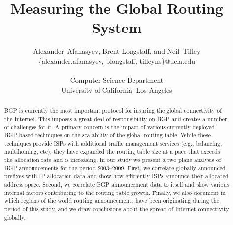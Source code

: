 \documentclass[journal,final]{IEEEtran}%
\title{Measuring the Global Routing System}
\author{
Alexander~Afanasyev, %
Brent Longstaff, and Neil~Tilley \\
\small \{alexander.afanasyev, blongstaff, tilleyns\}@ucla.edu \\ \ \\
\small Computer Science Department \\
\small University of California, Los Angeles 
}
\begin{document}
\maketitle

\begin{abstract} %

BGP is currently the most important protocol for insuring the global
connectivity of the Internet. This imposes a great deal of responsibility on
BGP and creates a number of challenges for it. A primary concern is the impact
of various currently deployed BGP-based techniques on the scalability of the
global routing table. While these techniques provide ISPs with additional
traffic management services (e.g., balancing, multihoming, etc), they have
expanded the routing table size at a pace that exceeds the allocation rate and
is increasing. In our study we present a two-plane analysis of BGP
announcements for the period 2003--2009. First, we correlate globally
announced prefixes with IP allocation data and show how efficiently ISPs
announce their allocated address space. Second, we correlate BGP announcement
data to itself and show various internal factors contributing to the routing
table growth. Finally, we also document in which regions of the world routing
announcements have been originating during the period of this study, and we
draw conclusions about the spread of Internet connectivity globally.


\end{abstract}











% 
% 



\end{document}
